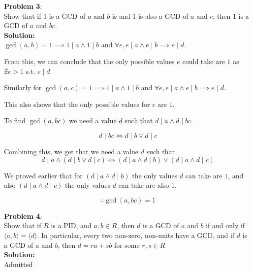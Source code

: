 \documentclass[11pt]{article}
\newcommand{\prob}[3]{\begin{flushleft}
        \textbf{Problem #1}: \\
        #2 
		\textbf{Solution:} 
		#3

\end{flushleft}}
\begin{document}
\prob{3}{
  Show that if $1$ is a GCD of $a$ and $b$ is and $1$ is also a GCD of $a$ and $c$, then $1$ is a GCD of $a$ and $bc$. \\
}{ \\
  $\gcd(a,b) = 1 \implies 1 \mid a \land 1 \mid b$ and $\forall e, e \mid a \land e \mid b \implies e \mid d$.

  From this, we can conclude that the only possible values $e$ could take are $1$ as $\nexists e > 1$ s.t. $e \mid d$

  Similarly for $\gcd(a,c) = 1 \implies 1 \mid a \land 1 \mid b$ and $\forall e, e \mid a \land e \mid b \implies e \mid d$.

  This also shows that the only possible values for $e$ are $1$.

  To find $\gcd(a, bc)$ we need a value $d$ such that $d \mid a \land d \mid bc$.

  $$d \mid bc \iff d \mid b \lor d \mid c$$

  Combining this, we get that we need a value $d$ such that
  $$d \mid a \land (d \mid b \lor d \mid c) \iff (d \mid a \land d \mid b) \lor (d \mid a \land d \mid c)$$

  We proved earlier that for $(d \mid a \land d \mid b)$ the only values $d$ can take are $1$, and also $(d \mid a \land d \mid c)$ the only values $d$ can take are also $1$.

  $$\therefore \gcd(a,bc) = 1$$
}

\prob{4}{
  Show that if $R$ is a PID, and $a, b \in R$, then $d$ is a GCD of $a$ and $b$ if and only if $\langle a, b \rangle = \langle d \rangle$.
  In particular, every two non-zero, non-units have a GCD, and if $d$ is a GCD of $a$ and $b$, then $d = ra + sb$ for some $r, s \in R$ \\
}{ \\
  Admitted
}
\end{document}
